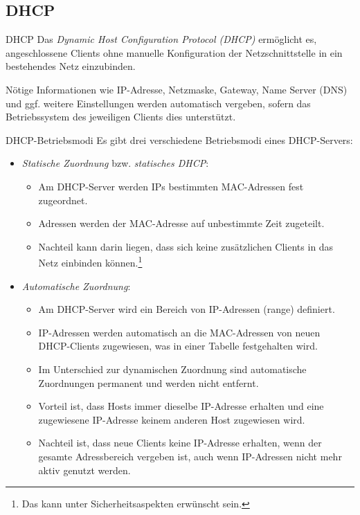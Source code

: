 \subsection{DHCP}

\begin{defi}{DHCP}
    Das \emph{Dynamic Host Configuration Protocol (DHCP)} ermöglicht es, angeschlossene Clients ohne manuelle Konfiguration der Netzschnittstelle in ein bestehendes Netz einzubinden.

    Nötige Informationen wie IP-Adresse, Netzmaske, Gateway, Name Server (DNS) und ggf. weitere Einstellungen werden automatisch vergeben, sofern das Betriebssystem des jeweiligen Clients dies unterstützt.
\end{defi}

\begin{defi}{DHCP-Betriebsmodi}
    Es gibt drei verschiedene Betriebsmodi eines DHCP-Servers:
    \begin{itemize}
        \item \emph{Statische Zuordnung} bzw. \emph{statisches DHCP}:
              \begin{itemize}
                  \item Am DHCP-Server werden IPs bestimmten MAC-Adressen fest zugeordnet.
                  \item Adressen werden der MAC-Adresse auf unbestimmte Zeit zugeteilt.
                  \item Nachteil kann darin liegen, dass sich keine zusätzlichen Clients in das Netz einbinden können.\footnote{Das kann unter Sicherheitsaspekten erwünscht sein.}
              \end{itemize}
        \item \emph{Automatische Zuordnung}:
              \begin{itemize}
                  \item Am DHCP-Server wird ein Bereich von IP-Adressen (range) definiert.
                  \item IP-Adressen werden automatisch an die MAC-Adressen von neuen DHCP-Clients zugewiesen, was in einer Tabelle festgehalten wird.
                  \item Im Unterschied zur dynamischen Zuordnung sind automatische Zuordnungen permanent und werden nicht entfernt.
                  \item Vorteil ist, dass Hosts immer dieselbe IP-Adresse erhalten und eine zugewiesene IP-Adresse keinem anderen Host zugewiesen wird.
                  \item Nachteil ist, dass neue Clients keine IP-Adresse erhalten, wenn der gesamte Adressbereich vergeben ist, auch wenn IP-Adressen nicht mehr aktiv genutzt werden.

\end{itemize}
\end{itemize}
\end{defi}
